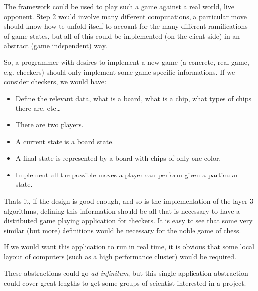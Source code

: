 \documentclass[a4paper,12pt,english]{report}
\begin{document}
The framework could be used to play such a game against a real world, live opponent. Step 2 would involve many different computations, a particular move should know how to unfold itself to account for the many different ramifications of game-states, but all of this could be implemented (on the client side) in an abstract (game independent) way.

So, a programmer with desires to implement a new game (a concrete, real game, e.g. checkers) should only implement some game specific informations. If we consider checkers, we would have:
\begin{itemize}
 \item Define the relevant data, what is a board, what is a chip, what types of chips there are, etc\ldots
 \item There are two players.
 \item A current state is a board state.
 \item A final state is represented by a board with chips of only one color.
 \item Implement all the possible moves a player can perform given a particular state.
\end{itemize}

Thats it, if the design is good enough, and so is the implementation of the layer 3 algorithms, defining this information should be all that is necessary to have a distributed game playing application for checkers. It is easy to see that some very similar (but more) definitions would be necessary for the noble game of chess.

If we would want this application to run in real time, it is obvious that some local layout of computers (such as a high performance cluster) would be required.

These abstractions could go \emph{ad infinitum}, but this single application abstraction could cover great lengths to get some groups of scientist interested in a project.





\appendix \label{appendix}
\addappheadtotoc

\appendixpage

\newpage
\end{document}

